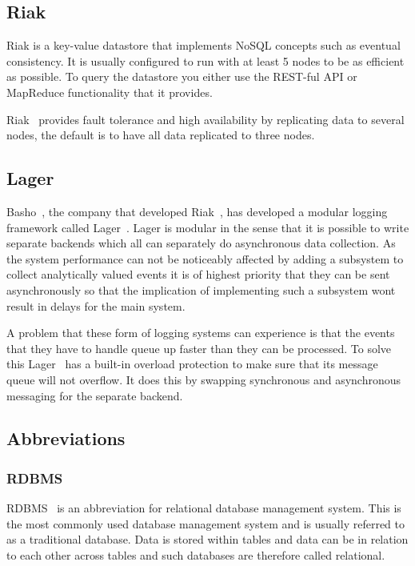 \documentclass[a4paper,12pt]{article}
\begin{document}
\subsection{Riak}
Riak is a key-value datastore that implements NoSQL concepts such as eventual consistency. It is usually configured to run with at least 5 nodes to be as efficient as possible.
To query the datastore you either use the REST-ful API or MapReduce functionality that it provides.

Riak~\cite{RIAK} provides fault tolerance and high availability by replicating data to several nodes, the default is to have all data replicated to three nodes.

\subsection{Lager}
Basho~\cite{BASHO}, the company that developed Riak~\cite{RIAK}, has developed a modular logging framework called Lager~\cite{LAGER}. Lager is modular in the sense that it is possible to write separate backends 
which all can separately do asynchronous data collection. As the system performance can not be noticeably affected by adding a subsystem to collect analytically valued events it is of highest priority 
that they can be sent asynchronously so that the implication of implementing such a subsystem wont result in delays for the main system. 

A problem that these form of logging systems can experience is that the events that they have to handle queue up faster than they can be processed. To solve this Lager~\cite{LAGER} has a built-in overload protection 
to make sure that its message queue will not overflow. It does this by swapping synchronous and asynchronous messaging for the separate backend.

\subsection{Abbreviations}

\subsubsection{RDBMS}
RDBMS~\cite{RDBMS} is an abbreviation for relational database management system. This is the most commonly used database management system and is usually referred to as a traditional database. Data is stored within tables and data can be in relation to each 
other across tables and such databases are therefore called relational.
\end{document}
